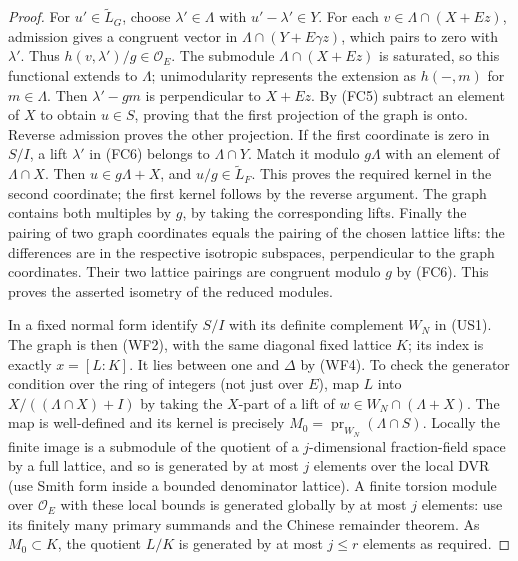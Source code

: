 \begin{proof}
For \(u'\in\widetilde L_G\), choose \(\lambda'\in\Lambda\)
with \(u'-\lambda'\in Y\).
For each \(v\in\Lambda\cap(X+Ez)\), admission gives a
congruent vector in \(\Lambda\cap(Y+E\gamma z)\),
which pairs to zero with \(\lambda'\).
Thus \(h(v,\lambda')/g\in\mathcal O_E\).
The submodule \(\Lambda\cap(X+Ez)\) is saturated, so
this functional extends to \(\Lambda\); unimodularity
represents the extension as \(h(-,m)\) for \(m\in\Lambda\).
Then \(\lambda'-gm\) is perpendicular to \(X+Ez\).
By (FC5) subtract an element of \(X\) to obtain
\(u\in S\), proving that the first projection of the graph
is onto.  Reverse admission proves the other projection.
If the first coordinate is zero in \(S/I\), a lift
\(\lambda'\) in (FC6) belongs to \(\Lambda\cap Y\).
Match it modulo \(g\Lambda\) with an element of
\(\Lambda\cap X\).  Then \(u\in g\Lambda+X\), and
\(u/g\in\widetilde L_F\).  This proves the required
kernel in the second coordinate; the first kernel follows
by the reverse argument.  The graph contains both
multiples by \(g\), by taking the corresponding lifts.
Finally the pairing of two graph coordinates equals
the pairing of the chosen lattice lifts: the differences
are in the respective isotropic subspaces, perpendicular
to the graph coordinates.  Their two lattice pairings
are congruent modulo \(g\) by (FC6).  This proves
the asserted isometry of the reduced modules.

In a fixed normal form identify \(S/I\) with its
definite complement \(W_N\) in (US1).  The graph is
then (WF2), with the same diagonal fixed lattice \(K\);
its index is exactly \(x=[L:K]\).  It lies between one
and \(\Delta\) by (WF4).  To check the generator condition
over the ring of integers (not just over \(E\)), map
\(L\) into \(X/((\Lambda\cap X)+I)\) by taking the
\(X\)-part of a lift of \(w\in W_N\cap(\Lambda+X)\).
The map is well-defined and its kernel is precisely
\(M_0=\operatorname{pr}_{W_N}(\Lambda\cap S)\).
Locally the finite image is a submodule of the quotient
of a \(j\)-dimensional fraction-field space by a full
lattice, and so is generated by at most \(j\) elements
over the local DVR (use Smith form inside a bounded
denominator lattice).  A finite torsion module over
\(\mathcal O_E\) with these local bounds is generated
globally by at most \(j\) elements: use its finitely many
primary summands and the Chinese remainder theorem.
As \(M_0\subset K\), the quotient \(L/K\) is generated
by at most \(j\le r\) elements as required.
\end{proof}

